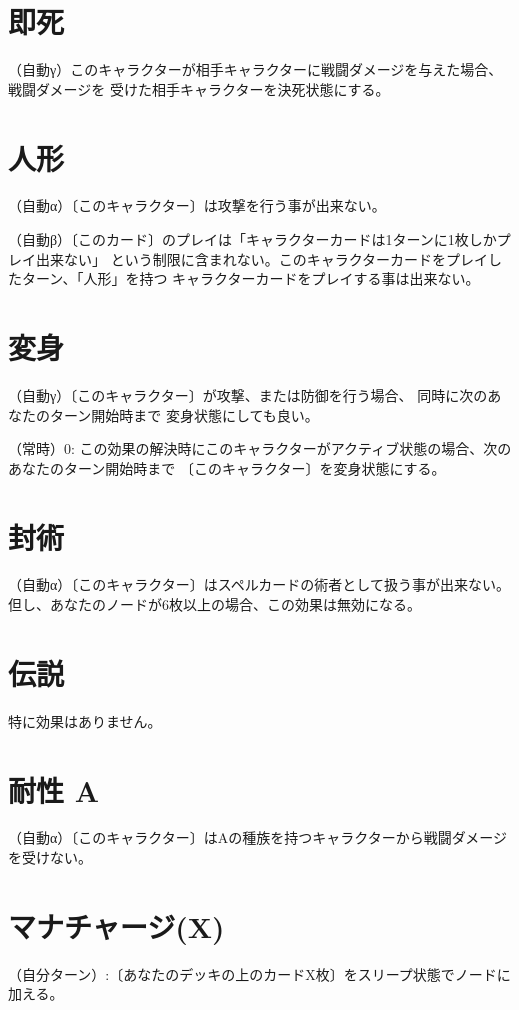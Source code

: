 \documentclass[fontsize=9pt,twocolumn,hanging_punctuation]{jlreq}
\begin{document}
\section*{即死}
（自動γ）このキャラクターが相手キャラクターに戦闘ダメージを与えた場合、戦闘ダメージを
受けた相手キャラクターを決死状態にする。

\section*{人形}
（自動α）〔このキャラクター〕は攻撃を行う事が出来ない。

（自動β）〔このカード〕のプレイは「キャラクターカードは1ターンに1枚しかプレイ出来ない」
という制限に含まれない。このキャラクターカードをプレイしたターン、「人形」を持つ
キャラクターカードをプレイする事は出来ない。

\section*{変身}
（自動γ）〔このキャラクター〕が攻撃、または防御を行う場合、 同時に次のあなたのターン開始時まで
変身状態にしても良い。

（常時）0: この効果の解決時にこのキャラクターがアクティブ状態の場合、次のあなたのターン開始時まで
〔このキャラクター〕を変身状態にする。

\section*{封術}
（自動α）〔このキャラクター〕はスペルカードの術者として扱う事が出来ない。
但し、あなたのノードが6枚以上の場合、この効果は無効になる。

\section*{伝説}
特に効果はありません。

\pagebreak
\section*{耐性 A}
（自動α）〔このキャラクター〕はAの種族を持つキャラクターから戦闘ダメージを受けない。

\section*{マナチャージ(X)}
（自分ターン）:〔あなたのデッキの上のカードX枚〕をスリープ状態でノードに加える。
\end{document}
